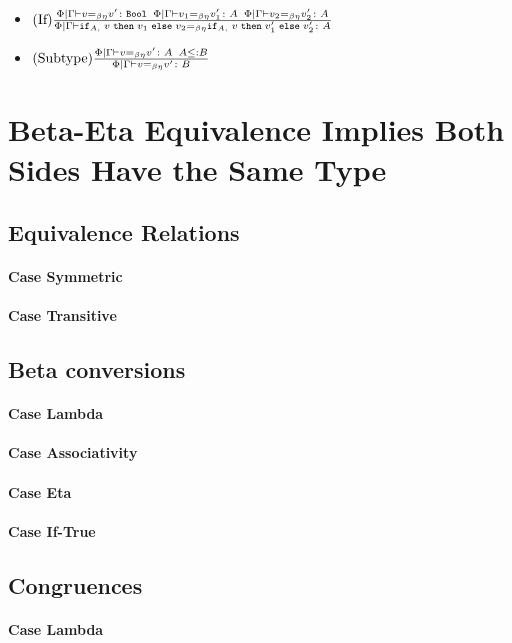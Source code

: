 {\begin{itemize}
        \item $(\text{If}) \frac{\Phi\mid\Gamma \vdash v =_{\beta\eta} v' \colon \texttt{Bool} \;\; \Phi\mid\Gamma \vdash v_1 =_{\beta\eta} v_1' \colon A\;\;\Phi\mid\Gamma \vdash v_2 =_{\beta\eta} v_2' \colon A}{\Phi\mid\Gamma \vdash \texttt{if}_{A, }\; v\; \texttt{then}\; v_1 \;\texttt{else} \; v_2 =_{\beta\eta} \texttt{if}_{A, }\; v\; \texttt{then}\; v_1' \;\texttt{else} \; v_2' \colon A}$
        \item $(\text{Subtype}) \frac{\Phi\mid\Gamma \vdash v =_{\beta\eta} v' \colon A \;\; A \leq: B}{\Phi\mid\Gamma \vdash v =_{\beta\eta} v' \colon B}$
    \end{itemize}
\section{Beta-Eta Equivalence Implies Both Sides Have the Same Type}

    \subsection{Equivalence Relations}
        \paragraph{Case Symmetric} 
        \paragraph{Case Transitive}
    \subsection{Beta conversions}
        \paragraph{Case Lambda}
        \paragraph{Case Associativity}
        \paragraph{Case Eta}
        \paragraph{Case If-True}
    \subsection{Congruences}
        \paragraph{Case Lambda}
}
